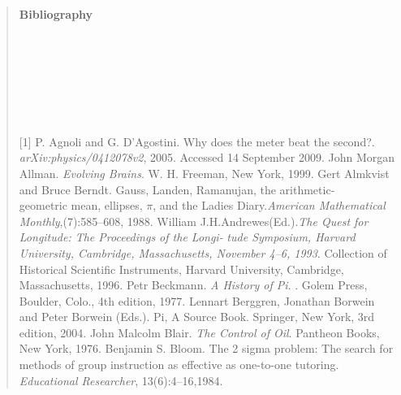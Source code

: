 \documentclass[a4paper,fleqn]{book}
\begin{document}
\begin{quote}
\Huge\textbf{Bibliography}\\\\\\\\\\\\\\\\
\normalsize\pagestyle{empty}
[1]\; P. Agnoli and G. D’Agostini. Why does the meter beat the second?.\\
 \emph{arXiv:physics/0412078v2}, 2005. Accessed 14 September 2009.\newline\newline
[2]\; John Morgan Allman. \emph{Evolving Brains}. W. H. Freeman, New York,             1999.\newline\newline 
[3]\; Gert Almkvist and Bruce Berndt. Gauss, Landen, Ramanujan, the arithmetic-\\geometric
mean, ellipses, $\pi$, and the Ladies Diary.\emph{American Mathematical Monthly},(7):585–608, 1988.\newline\newline
[4]\; William J.H.Andrewes(Ed.).\emph{The Quest for Longitude: The Proceedings of the Longi-}\newline
\emph{tude Symposium, Harvard University, Cambridge, Massachusetts, November 4–6, 1993}. 
Collection of Historical Scientific Instruments,  Harvard University, Cambridge,\\
Massachusetts, 1996.\newline\newline
[5]\;  Petr Beckmann. \emph{A History of Pi}. . Golem Press, Boulder, Colo., 4th edition, 1977.\newline\newline
[6]\;  Lennart Berggren, Jonathan Borwein and Peter Borwein (Eds.). Pi, A Source Book.
Springer, New York, 3rd edition, 2004.\newline\newline
[7]\; John Malcolm Blair. \emph{The Control of Oil}. Pantheon Books, New York, 1976.\newline\newline
[8]\; Benjamin S. Bloom. The 2 sigma problem: The search for methods of group
instruction as effective as one-to-one tutoring. \emph{Educational Researcher}, 13(6):4–16,1984.\newline\newline

\end{quote}
\end{document}
